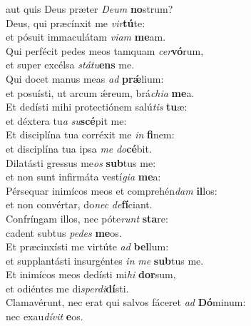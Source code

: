 \evenverse aut quis Deus præter \textit{De}\textit{um} \textbf{no}strum?\\
\oddverse Deus, qui præcínxit me \textit{vir}\textbf{tú}te:~\*\\
\oddverse et pósuit immaculátam \textit{vi}\textit{am} \textbf{me}am.\\
\evenverse Qui perfécit pedes meos tamquam \textit{cer}\textbf{vó}rum,~\*\\
\evenverse et super excélsa \textit{stá}\textit{tu}\textbf{ens} me.\\
\oddverse Qui docet manus meas \textit{ad} \textbf{prǽ}lium:~\*\\
\oddverse et posuísti, ut arcum ǽreum, brá\textit{chi}\textit{a} \textbf{me}a.\\
\evenverse Et dedísti mihi protectiónem salú\textit{tis} \textbf{tu}æ:~\*\\
\evenverse et déxtera tu\textit{a} \textit{su}\textbf{scé}pit me:\\
\oddverse Et disciplína tua corréxit me \textit{in} \textbf{fi}nem:~\*\\
\oddverse et disciplína tua ipsa \textit{me} \textit{do}\textbf{cé}bit.\\
\evenverse Dilatásti gressus me\textit{os} \textbf{sub}tus me:~\*\\
\evenverse et non sunt infirmáta vestí\textit{gi}\textit{a} \textbf{me}a:\\
\oddverse Pérsequar inimícos meos et comprehén\textit{dam} \textbf{il}los:~\*\\
\oddverse et non convértar, do\textit{nec} \textit{de}\textbf{fí}ciant.\\
\evenverse Confríngam illos, nec póte\textit{runt} \textbf{sta}re:~\*\\
\evenverse cadent subtus \textit{pe}\textit{des} \textbf{me}os.\\
\oddverse Et præcinxísti me virtúte \textit{ad} \textbf{bel}lum:~\*\\
\oddverse et supplantásti insurgéntes \textit{in} \textit{me} \textbf{sub}tus me.\\
\evenverse Et inimícos meos dedísti mi\textit{hi} \textbf{dor}sum,~\*\\
\evenverse et odiéntes me di\textit{sper}\textit{di}\textbf{dí}sti.\\
\oddverse Clamavérunt, nec erat qui salvos fáceret \textit{ad} \textbf{Dó}minum:~\*\\
\oddverse nec exau\textit{dí}\textit{vit} \textbf{e}os.\\
